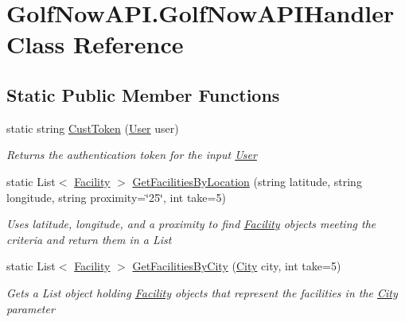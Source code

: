 \hypertarget{class_golf_now_a_p_i_1_1_golf_now_a_p_i_handler}{}\section{Golf\+Now\+A\+P\+I.\+Golf\+Now\+A\+P\+I\+Handler Class Reference}
\label{class_golf_now_a_p_i_1_1_golf_now_a_p_i_handler}
\subsection*{Static Public Member Functions}
\begin{DoxyCompactItemize}
\item 
static string \mbox{\hyperlink{class_golf_now_a_p_i_1_1_golf_now_a_p_i_handler_ae2f95c14f042ab3008642f30b0b93e36}{Cust\+Token}} (\mbox{\hyperlink{class_golf_now_a_p_i_1_1_user}{User}} user)
\begin{DoxyCompactList}\small\item\em Returns the authentication token for the input \mbox{\hyperlink{class_golf_now_a_p_i_1_1_user}{User}} \end{DoxyCompactList}\item 
static List$<$ \mbox{\hyperlink{class_golf_now_a_p_i_1_1_facility}{Facility}} $>$ \mbox{\hyperlink{class_golf_now_a_p_i_1_1_golf_now_a_p_i_handler_a944de1a0c317adc059274c10a7d444cd}{Get\+Facilities\+By\+Location}} (string latitude, string longitude, string proximity=\char`\"{}25\char`\"{}, int take=5)
\begin{DoxyCompactList}\small\item\em Uses latitude, longitude, and a proximity to find \mbox{\hyperlink{class_golf_now_a_p_i_1_1_facility}{Facility}} objects meeting the criteria and return them in a List \end{DoxyCompactList}\item 
static List$<$ \mbox{\hyperlink{class_golf_now_a_p_i_1_1_facility}{Facility}} $>$ \mbox{\hyperlink{class_golf_now_a_p_i_1_1_golf_now_a_p_i_handler_aaa4165dc6e7f348d02ba4dadfac977c3}{Get\+Facilities\+By\+City}} (\mbox{\hyperlink{class_golf_now_a_p_i_1_1_city}{City}} city, int take=5)
\begin{DoxyCompactList}\small\item\em Gets a List object holding \mbox{\hyperlink{class_golf_now_a_p_i_1_1_facility}{Facility}} objects that represent the facilities in the \mbox{\hyperlink{class_golf_now_a_p_i_1_1_city}{City}} parameter \end{DoxyCompactList}\item 

\end{DoxyCompactItemize}
